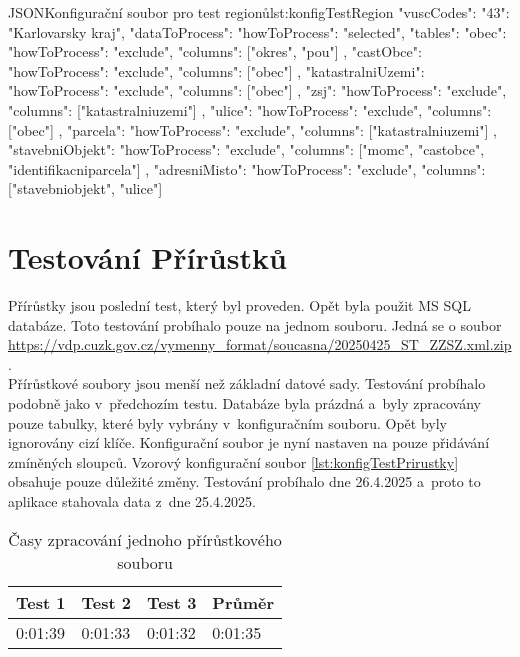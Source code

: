 \begin{code}{JSON}{Konfigurační soubor pro test regionů}{lst:konfigTestRegion}
  {
    "vuscCodes": {"43": "Karlovarsky kraj"},
    "dataToProcess": {
      "howToProcess": "selected",
      "tables": {
        "obec": {
          "howToProcess": "exclude",
          "columns": ["okres", "pou"]
        },
        "castObce": {
          "howToProcess": "exclude",
          "columns": ["obec"]
        },
        "katastralniUzemi": {
          "howToProcess": "exclude",
          "columns": ["obec"]
        },
        "zsj": {
          "howToProcess": "exclude",
          "columns": ["katastralniuzemi"]
        },
        "ulice": {
          "howToProcess": "exclude",
          "columns": ["obec"]
        },
        "parcela": {
          "howToProcess": "exclude",
          "columns": ["katastralniuzemi"]
        },
        "stavebniObjekt": {
          "howToProcess": "exclude",
          "columns": ["momc", "castobce", "identifikacniparcela"]
        },
        "adresniMisto": {
          "howToProcess": "exclude",
          "columns": ["stavebniobjekt", "ulice"]
        }
      }
    }
  }
\end{code}

\newpage

\section{Testování Přírůstků}
Přírůstky jsou poslední test, který byl proveden.
Opět byla použit MS SQL databáze. Toto testování probíhalo pouze na jednom souboru.
Jedná se o soubor \url{https://vdp.cuzk.gov.cz/vymenny_format/soucasna/20250425_ST_ZZSZ.xml.zip}. \\
Přírůstkové soubory jsou menší než základní datové sady.
Testování probíhalo podobně jako v~předchozím testu.
Databáze byla prázdná a~byly zpracovány pouze tabulky, které byly vybrány v~konfiguračním souboru.
Opět byly ignorovány cizí klíče. Konfigurační soubor je nyní nastaven na pouze přidávání zmíněných sloupců.
Vzorový konfigurační soubor \ref{lst:konfigTestPrirustky} obsahuje pouze důležité změny.
Testování probíhalo dne 26.4.2025 a~proto to aplikace stahovala data z~dne 25.4.2025.

\begin{table}[!h]
  \centering
  \caption{Časy zpracování jednoho přírůstkového souboru}
  \label{tab:test3}
  \begin{tabular}{|l|l|l|l|}
  \hline
  \textbf{Test 1} & \textbf{Test 2} & \textbf{Test 3} & \textbf{Průměr} \\ \hline
  0:01:39         & 0:01:33         & 0:01:32         & 0:01:35         \\ \hline
  \end{tabular}
\end{table}

